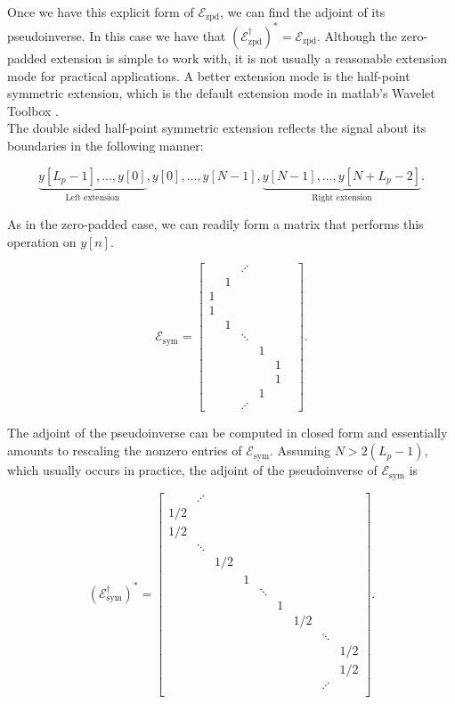 \documentclass[journal]{IEEEtran}
\begin{document}
\noindent Once we have this explicit form of $\mathcal{E}_\text{zpd}$, we can find the adjoint of its pseudoinverse.  In this case we have that $\left(\mathcal{E}_\text{zpd}^\dagger\right)^\ast = \mathcal{E}_\text{zpd}$.  Although the zero-padded extension is simple to work with, it is not usually a reasonable extension mode for practical applications.  A better extension mode is the half-point symmetric extension, which is the default extension mode in {\sc matlab}'s Wavelet Toolbox \cite{matlab_wt_2015}.\\

The double sided half-point symmetric extension reflects the signal about its boundaries in the following manner:

\[ \underbrace{y[L_p-1], ..., y[0]}_\text{Left extension}, y[0], ..., y[N-1], \underbrace{y[N-1], ..., y[N+L_p-2]}_\text{Right extension}. \] 

\noindent As in the zero-padded case, we can readily form a matrix that performs this operation on $y[n]$.

\[ \mathcal{E}_\text{sym} = \begin{bmatrix} & & \iddots & & &\\ & 1 &&&&\\ 1&&&&&\\1&&&&\\&1&&&&\\&&\ddots&&&\\&&&1&\\&&&&1\\&&&&1\\&&&1&\\&&\iddots&&\end{bmatrix}. \]

\noindent The adjoint of the pseudoinverse can be computed in closed form and essentially amounts to rescaling the nonzero entries of $\mathcal{E}_\text{sym}$.  Assuming $N > 2(L_p-1)$, which usually occurs in practice, the adjoint of the  pseudoinverse of $\mathcal{E}_\text{sym}$ is 

\[ \left(\mathcal{E}_\text{sym}^\dagger\right)^\ast = \begin{bmatrix} & \iddots \\ 1/2&&&&&\\1/2&&&&\\&\ddots&&&&&&\\&&1/2&\\&&&1\\&&&&\ddots\\&&&&&1\\&&&&&&1/2\\&&&&&&&\ddots\\&&&&&&&&1/2\\&&&&&&&&1/2\\&&&&&&&\iddots\\\end{bmatrix}. \]
\end{document}
